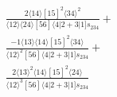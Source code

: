 \documentclass[varwidth, border=5pt]{standalone}
\begin{document}
\begin{my}
$\begin{gathered}
\scriptscriptstyle\frac{2⟨14⟩[15]^2⟨34⟩^2}{⟨12⟩⟨24⟩[56]⟨4|2+3|1]s_{234}}+\\
\scriptscriptstyle\frac{-1⟨13⟩⟨14⟩[15]^2⟨34⟩}{⟨12⟩^2[56]⟨4|2+3|1]s_{234}}+\\
\scriptscriptstyle\frac{2⟨13⟩^2⟨14⟩[15]^2⟨24⟩}{⟨12⟩^3[56]⟨4|2+3|1]s_{234}}\phantom{+}
\end{gathered}$
\end{my}
\end{document}
